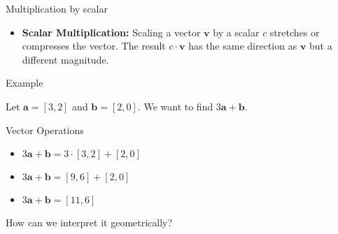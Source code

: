 \documentclass{beamer}
\begin{document}
\begin{frame}{Multiplication by scalar}
    \begin{itemize}
      \item \textbf{Scalar Multiplication:} Scaling a vector $\mathbf{v}$ by a scalar $c$ stretches or compresses the vector. The result $c \cdot \mathbf{v}$ has the same direction as $\mathbf{v}$ but a different magnitude.
    \end{itemize}

    \begin{center}
    \end{center}
\end{frame}

\begin{frame}{Example}

  \begin{example}
    Let \( \mathbf{a} = [3, 2]\) and \( \mathbf{b} = [2, 0] \). We want to find \( 3\mathbf{a} + \mathbf{b} \).
  \end{example}

  \pause

  \begin{block}{Vector Operations}
    \begin{itemize}
      \item \( 3\mathbf{a} + \mathbf{b} = 3 \cdot [3, 2] + [2, 0] \)
      \item \( 3\mathbf{a} + \mathbf{b} = [9,6] + [2, 0] \)
      \item \( 3\mathbf{a} + \mathbf{b} = [11, 6] \)
    \end{itemize}
  \end{block}

  \pause
How can we interpret it geometrically?

\end{frame}
\end{document}
